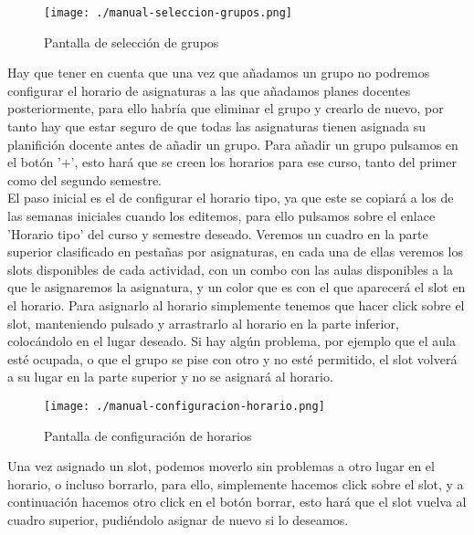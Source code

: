 \begin{figure}[H] 
  \label{manual-seleccion-grupos} 
	\begin{center}
    \texttt{[image: ./manual-seleccion-grupos.png]}
  \end{center}
\caption{Pantalla de selección de grupos}
\end{figure}

Hay que tener en cuenta que una vez que añadamos un grupo no podremos configurar el horario de asignaturas a las que añadamos planes docentes posteriormente, para ello habría que eliminar el grupo y crearlo de nuevo, por tanto hay que estar seguro de que todas las asignaturas tienen asignada su planifición docente antes de añadir un grupo. Para añadir un grupo pulsamos en el botón '+', esto hará que se creen los horarios para ese curso, tanto del primer como del segundo semestre.\\

El paso inicial es el de configurar el horario tipo, ya que este se copiará a los de las semanas iniciales cuando los editemos, para ello pulsamos sobre el enlace 'Horario tipo' del curso y semestre deseado.
Veremos un cuadro en la parte superior clasificado en pestañas por asignaturas, en cada una de ellas veremos los slots disponibles de cada actividad, con un combo con las aulas disponibles a la que le asignaremos la asignatura, y un color que es con el que aparecerá el slot en el horario. Para asignarlo al horario simplemente tenemos que hacer click sobre el slot, manteniendo pulsado y arrastrarlo al horario en la parte inferior, colocándolo en el lugar deseado. Si hay algún problema, por ejemplo que el aula esté ocupada, o que el grupo se pise con otro y no esté permitido, el slot volverá a su lugar en la parte superior y no se asignará al horario.\\

\begin{figure}[H] 
  \label{manual-configuracion-horario} 
	\begin{center}
    \texttt{[image: ./manual-configuracion-horario.png]}
  \end{center}
\caption{Pantalla de configuración de horarios}
\end{figure}

Una vez asignado un slot, podemos moverlo sin problemas a otro lugar en el horario, o incluso borrarlo, para ello, simplemente hacemos click sobre el slot, y a continuación hacemos otro click en el botón borrar, esto hará que el slot vuelva al cuadro superior, pudiéndolo asignar de nuevo si lo deseamos.\\


